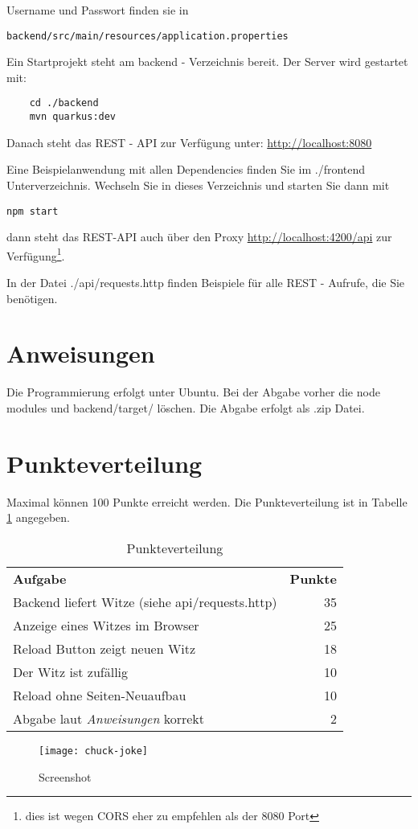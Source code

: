 \documentclass[a4paper, 11pt]{article}
\begin{document}
Username und Passwort finden sie in \begin{verbatim}backend/src/main/resources/application.properties\end{verbatim}

Ein Startprojekt steht am backend - Verzeichnis bereit. 
Der Server wird gestartet mit:
\begin{verbatim}
	cd ./backend
	mvn quarkus:dev
\end{verbatim}
Danach steht das REST - API zur Verfügung unter:
\href{http://localhost:8080}{http://localhost:8080}

Eine Beispielanwendung mit allen Dependencies finden Sie im ./frontend Unterverzeichnis.
Wechseln Sie in dieses Verzeichnis und starten Sie dann mit
\begin{verbatim}
npm start
\end{verbatim}

dann steht das REST-API auch über den Proxy 
\href{http://localhost:4200/api}{http://localhost:4200/api} zur Verfügung\footnote{dies ist wegen CORS eher zu empfehlen als der 8080 Port}.

In der Datei ./api/requests.http finden Beispiele für alle REST - Aufrufe, die Sie benötigen. 
\section{Anweisungen}

Die Programmierung erfolgt unter Ubuntu.
Bei der Abgabe vorher die node modules und backend/target/ löschen. Die Abgabe erfolgt als .zip Datei.

\section{Punkteverteilung}
Maximal können 100 Punkte erreicht werden. Die Punkteverteilung ist in Tabelle \ref{tab:points} angegeben.
\begin{table}[ht]
\centering
\caption{Punkteverteilung}

\begin{tabular}{| l | r |} \cline{1-2} 
\textbf{Aufgabe} &  \textbf{Punkte}  \\ \cline{1-2}
Backend liefert Witze (siehe api/requests.http) & 35 \\ \cline{1-2}
Anzeige eines Witzes im Browser & 25 \\ \cline{1-2}
Reload Button zeigt neuen Witz & 18 \\ \cline{1-2}
Der Witz ist zufällig & 10 \\ \cline{1-2}
Reload ohne Seiten-Neuaufbau & 10 \\ \cline{1-2}
Abgabe laut \textit{Anweisungen} korrekt & 2 \\ \cline{1-2}
\end{tabular}
\label{tab:points}
\end{table}

\begin{figure}
	\center
	\texttt{[image: chuck-joke]}
	\caption{Screenshot}
	\label{fig:img}
\end{figure}
\end{document}

